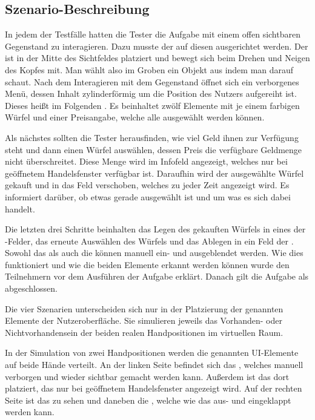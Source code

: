 		\subsection{Szenario-Beschreibung}\label{chapter:szenario}
			In jedem der Testfälle hatten die Tester die Aufgabe mit einem offen sichtbaren Gegenstand zu interagieren. Dazu musste der  auf diesen ausgerichtet werden. Der  ist in der Mitte des Sichtfeldes platziert und bewegt sich beim Drehen und Neigen des Kopfes mit. Man wählt also im Groben ein Objekt aus indem man darauf schaut.
			Nach dem Interagieren mit dem Gegenstand öffnet sich ein verborgenes Menü, dessen Inhalt zylinderförmig um die Position des Nutzers aufgereiht ist. Dieses heißt im Folgenden . Es beinhaltet zwölf Elemente mit je einem farbigen Würfel und einer Preisangabe, welche alle ausgewählt werden können.
			
			Als nächstes sollten die Tester herausfinden, wie viel Geld ihnen zur Verfügung steht und dann einen Würfel auswählen, dessen Preis die verfügbare Geldmenge nicht überschreitet. Diese Menge wird im Infofeld  angezeigt, welches nur bei geöffnetem Handelsfenster verfügbar ist.
			Daraufhin wird der ausgewählte Würfel gekauft und in das Feld  verschoben, welches zu jeder Zeit angezeigt wird. Es informiert darüber, ob etwas gerade ausgewählt ist und um was es sich dabei handelt.
			
			Die letzten drei Schritte beinhalten das Legen des gekauften Würfels in eines der -Felder, das erneute Auswählen des Würfels und das Ablegen in ein Feld der . Sowohl das  als auch die  können manuell ein- und ausgeblendet werden. Wie dies funktioniert und wie die beiden Elemente erkannt werden können wurde den Teilnehmern vor dem Ausführen der Aufgabe erklärt.
			Danach gilt die Aufgabe als abgeschlossen.
			
			Die vier Szenarien unterscheiden sich nur in der Platzierung der genannten Elemente der Nutzeroberfläche. Sie simulieren jeweils das Vorhanden- oder Nichtvorhandensein der beiden realen Handpositionen im virtuellen Raum. 
			
			
			In der Simulation von zwei Handpositionen werden die genannten UI-Elemente auf beide Hände verteilt. An der linken Seite befindet sich das , welches manuell verborgen und wieder sichtbar gemacht werden kann. Außerdem ist das  dort platziert, das nur bei geöffnetem Handelsfenster angezeigt wird. Auf der rechten Seite ist das  zu sehen und daneben die , welche wie das  aus- und eingeklappt werden kann.
			
